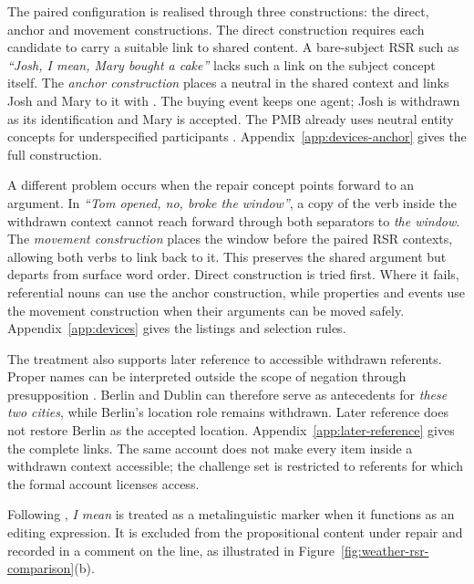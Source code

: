 The paired configuration is realised through three constructions: the direct,
anchor and movement constructions. The direct construction requires each
candidate to carry a suitable link to shared content. A bare-subject RSR such
as \textit{``Josh, I mean, Mary
bought a cake''} lacks such a link on the subject concept itself. The
\emph{anchor construction} places a neutral  in the shared
context and links Josh and Mary to it with . The buying event
keeps one agent; Josh is withdrawn as its identification and Mary is accepted.
The PMB already uses neutral entity concepts for underspecified participants
\citep{abzianidzeParallelMeaningBank2017}. Appendix~\ref{app:devices-anchor}
gives the full construction.

A different problem occurs when the repair concept points forward to an
argument. In \textit{``Tom opened, no, broke the window''}, a copy of the
verb inside the withdrawn context cannot reach forward through both separators
to \textit{the window}. The \emph{movement construction} places the window before
the paired RSR contexts, allowing both verbs to link back to it. This preserves the
shared argument but departs from surface word order. Direct construction is
tried first. Where it fails, referential nouns can use the anchor construction,
while properties and events use the movement construction when their arguments
can be moved safely.
Appendix~\ref{app:devices} gives the listings and selection rules.

The treatment also supports later reference to accessible withdrawn
referents. Proper names can be interpreted outside the scope of negation
through presupposition
\citep[Section~7]{bosVariablefreeDiscourseRepresentation2021}. Berlin and
Dublin can therefore serve as antecedents for \textit{these two cities}, while
Berlin's location role remains withdrawn. Later reference does not restore
Berlin as the accepted location. Appendix~\ref{app:later-reference} gives the
complete  links. The same account does not make every item inside
a withdrawn context accessible; the challenge set is restricted to referents
for which the formal account licenses access.

Following \citet{maschlerMetalanguagingDiscourseMarkers1994},
\textit{I mean} is treated as a metalinguistic marker when it functions as an
editing expression. It is excluded from the propositional content under repair
and recorded in a \sbnterm{\%} comment on the  line, as
illustrated in Figure~\ref{fig:weather-rsr-comparison}(b).


